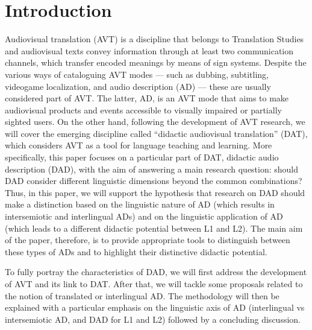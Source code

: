 \documentclass[english]{textolivre}
\begin{document}
\section{Introduction}\label{sec-intro}
Audiovisual translation (AVT) is a discipline that belongs to Translation Studies and audiovisual texts convey information through at least two communication channels, which transfer encoded meanings by means of sign systems. Despite the various ways of cataloguing AVT modes — such as dubbing, subtitling, videogame localization, and audio description (AD) — these are usually considered part of AVT. The latter, AD, is an AVT mode that aims to make audiovisual products and events accessible to visually impaired or partially sighted users. On the other hand, following the development of AVT research, we will cover the emerging discipline called “didactic audiovisual translation” (DAT), which considers AVT as a tool for language teaching and learning. More specifically, this paper focuses on a particular part of DAT, didactic audio description (DAD), with the aim of answering a main research question: should DAD consider different linguistic dimensions beyond the common combinations? Thus, in this paper, we will support the hypothesis that research on DAD should make a distinction based on the linguistic nature of AD (which results in intersemiotic and interlingual ADs) and on the linguistic application of AD (which leads to a different didactic potential between L1 and L2). The main aim of the paper, therefore, is to provide appropriate tools to distinguish between these types of ADs and to highlight their distinctive didactic potential.

To fully portray the characteristics of DAD, we will first address the development of AVT and its link to DAT. After that, we will tackle some proposals related to the notion of translated or interlingual AD. The methodology will then be explained with a particular emphasis on the linguistic axis of AD (interlingual vs intersemiotic AD, and DAD for L1 and L2) followed by a concluding discussion.
\end{document}
